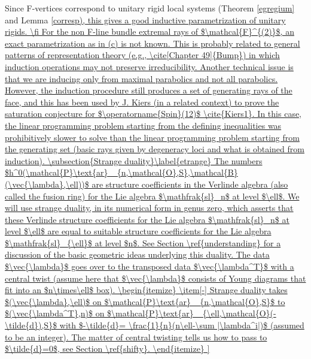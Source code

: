\documentclass[11pt]{amsart}
\newcommand\op{\operatorname}
\newcommand\mf{\mathcal{F}}
\newcommand\Par{\mathcal{P}\text{ar} }
\numberwithin{theorem}{subsection}
\begin{document}
Since F-vertices correspond to unitary rigid local systems (Theorem \ref{egregium} and Lemma \ref{corresp), this gives a good inductive parametrization of unitary rigids.
\fi

For the non F-line bundle extremal rays of  $\mf^{(2)}$, an exact parametrization as in (c) is not known. This is probably related to general patterns of representation theory (e.g., \cite[Chapter 49]{Bump}) in which induction operations  may not preserve irreducibility. Another technical issue is that we are inducing only from maximal parabolics and not all parabolics. However, the induction procedure still produces a set of generating rays of the face, and this has been used by J. Kiers (in a related context) to prove  the saturation conjecture for $\op{Spin}(12)$  \cite{Kiers1}. In this case, the linear programming problem starting from the defining inequalities was prohibitively slower to solve than the linear programming problem starting from the generating set (basic rays given by degeneracy loci and what is obtained from
induction).



\subsection{Strange duality}\label{etrange}
The numbers $h^0(\Par_{n,\mathcal{O},S},\mathcal{B}(\vec{\lambda},\ell))$ are structure coefficients in the Verlinde algebra (also called the fusion ring)
for the Lie algebra $\mathfrak{sl}_n$ at level $\ell$.  We will use strange duality, in its numerical form in genus zero,  which asserts that these Verlinde structure coefficients for the Lie algebra $\mathfrak{sl}_n$ at level $\ell$ are equal to suitable structure coefficients for the Lie algebra $\mathfrak{sl}_{\ell}$ at level $n$. See Section \ref{understanding} for a discussion of the basic  geometric ideas underlying this duality.

The data $\vec{\lambda}$ goes over to the transposed data $\vec{\lambda^T}$ with a central  twist (assume here that $\vec{\lambda}$ consists of Young diagrams that fit into an $n\times\ell$ box).
\begin{itemize}
\item[-] Strange duality takes $(\vec{\lambda},\ell)$ on $\Par_{n,\mathcal{O},S}$ to $(\vec{\lambda^T},n)$ on $\Par_{\ell,\mathcal{O}(-\tilde{d}),S}$ with $-\tilde{d}= \frac{1}{n}(n\ell-\sum |\lambda^i|)$ (assumed to be an integer). The matter of central twisting tells us how to pass to $\tilde{d}=0$, see Section \ref{shifty}.
\end{itemize}

}
\end{document}
